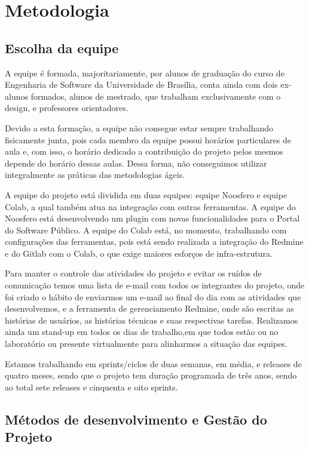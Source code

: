 \section{Metodologia}
\label{sec:metodologia}

\subsection{Escolha da equipe}
\label{sec:equipe}

A equipe é formada, majoritariamente, por alunos de graduação do curso de Engenharia de Software da Universidade de Brasília, conta ainda com dois ex-alunos formados, alunos de mestrado, que trabalham exclusivamente com o design, e professores orientadores. 
	
	Devido a esta formação, a equipe não consegue estar sempre trabalhando fisicamente junta, pois cada membro da equipe possui horários particulares de aula e, com isso, o horário dedicado a contribuição do projeto pelos mesmos depende do horário dessas aulas. Dessa forma, não conseguimos utilizar integralmente as práticas das metodologias ágeis.
	
	A equipe do projeto está dividida em duas equipes: equipe Noosfero e equipe Colab, a qual também atua na integração com outras ferramentas. A equipe do Noosfero está desenvolvendo um plugin com novas funcionalidades para o Portal do Software Público. A equipe do Colab está, no momento, trabalhando com configurações das ferramentas, pois está sendo realizada a integração do Redmine e do Gitlab com o Colab, o que exige maiores esforços de infra-estrutura.
	
	Para manter o controle das atividades do projeto e evitar os ruídos de comunicação temos uma lista de e-mail com todos os integrantes do projeto, onde foi criado o hábito de enviarmos um e-mail ao final do dia com as atividades que desenvolvemos, e a ferramenta de gerenciamento Redmine, onde são escritas as histórias de usuários, as histórias técnicas e suas respectivas tarefas. Realizamos ainda um stand-up em todos os dias de trabalho,em que todos estão ou no laboratório ou presente virtualmente para alinharmos a situação das equipes. 
	
	Estamos trabalhando em sprints/ciclos de duas semanas, em média, e releases de quatro meses, sendo que o projeto tem duração programada de três anos, sendo ao total sete releases e cinquenta e oito sprints.


\subsection{Métodos de desenvolvimento e Gestão do Projeto}
\label{sec:metodo-gestao}

